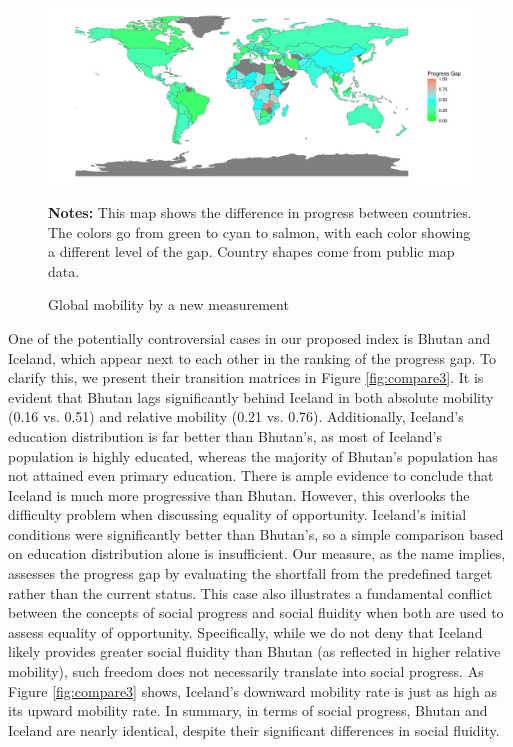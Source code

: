 \begin{figure}[h!]
    \centering
    \includegraphics[width=1\linewidth]{figs/map.pdf}
    \caption{Global mobility by a new measurement}
    \label{fig:map}
        \begin{minipage}{1\linewidth}
    	\vspace{0.2cm}
    	\footnotesize
    	\textbf{Notes:} This map shows the difference in progress between countries. The colors go from green to cyan to salmon, with each color showing a different level of the gap. Country shapes come from public map data.		
    \end{minipage}
\end{figure}

One of the potentially controversial cases in our proposed index is Bhutan and Iceland, which appear next to each other in the ranking of the progress gap. To clarify this, we present their transition matrices in Figure \ref{fig:compare3}. It is evident that Bhutan lags significantly behind Iceland in both absolute mobility (0.16 vs. 0.51) and relative mobility (0.21 vs. 0.76). Additionally, Iceland's education distribution is far better than Bhutan's, as most of Iceland's population is highly educated, whereas the majority of Bhutan's population has not attained even primary education. There is ample evidence to conclude that Iceland is much more progressive than Bhutan. However, this overlooks the difficulty problem when discussing equality of opportunity. Iceland's initial conditions were significantly better than Bhutan's, so a simple comparison based on education distribution alone is insufficient. Our measure, as the name implies, assesses the progress gap by evaluating the shortfall from the predefined target rather than the current status.  This case also illustrates a fundamental conflict between the concepts of social progress and social fluidity when both are used to assess equality of opportunity. Specifically, while we do not deny that Iceland likely provides greater social fluidity than Bhutan (as reflected in higher relative mobility), such freedom does not necessarily translate into social progress. As Figure \ref{fig:compare3} shows, Iceland's downward mobility rate is just as high as its upward mobility rate. In summary, in terms of social progress, Bhutan and Iceland are nearly identical, despite their significant differences in social fluidity.


